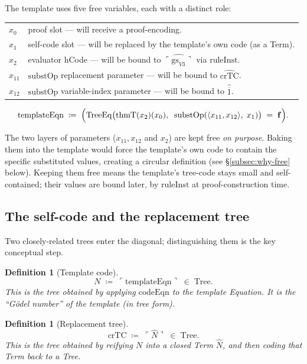 \documentclass[11pt]{article}
\newtheorem{definition}[theorem]{Definition}
\newcommand{\pair}[2]{\langle #1, #2 \rangle}
\newcommand{\falseT}{\mathbf{f}}
\newcommand{\nat}[1]{\overline{#1}}
\newcommand{\code}[1]{\ulcorner #1 \urcorner}
\newcommand{\reify}[1]{\widehat{#1}}
\newcommand{\thmT}{\mathrm{thmT}}
\newcommand{\substOp}{\mathrm{substOp}}
\newcommand{\TreeEq}{\mathrm{TreeEq}}
\begin{document}
The template uses five free variables, each with a distinct role:
\begin{center}
\begin{tabular}{@{}ll@{}}
  $x_0$    & proof slot --- will receive a proof-encoding. \\
  $x_1$    & self-code slot --- will be replaced by the template's own
               code (as a Term). \\
  $x_2$    & evaluator hCode --- will be bound to
               $\reify{\code{\mathrm{gs}_{V3}}}$ via $\mathrm{ruleInst}$. \\
  $x_{11}$ & $\substOp$ replacement parameter --- will be bound to
               $\reify{\mathrm{crTC}}$. \\
  $x_{12}$ & $\substOp$ variable-index parameter --- will be bound to
               $\reify{\nat{1}}$.
\end{tabular}
\end{center}

\[
  \mathrm{templateEqn} \;\coloneqq\;
  \Bigl(\TreeEq\bigl(\thmT(x_2)(x_0),\;\;
         \substOp(\pair{x_{11}}{x_{12}},\; x_1)\bigr) \;=\; \falseT\Bigr).
\]

The two layers of parameters ($x_{11}, x_{12}$ and $x_2$) are kept
free \emph{on purpose}.  Baking them into the template would force
the template's own code to contain the specific substituted values,
creating a circular definition (see \S\ref{subsec:why-free} below).
Keeping them free means the template's tree-code stays small and
self-contained; their values are bound later, by
$\mathrm{ruleInst}$ at proof-construction time.

\subsection{The self-code and the replacement tree}
\label{subsec:N-and-crTC}

Two closely-related trees enter the diagonal; distinguishing them is
the key conceptual step.

\begin{definition}[Template code]
\[
  N \;\coloneqq\; \code{\mathrm{templateEqn}} \;\in\; \mathrm{Tree}.
\]
This is the tree obtained by applying $\mathrm{codeEqn}$ to the
template Equation.  It is the ``Gödel number'' of the template
(in tree form).
\end{definition}

\begin{definition}[Replacement tree]
\[
  \mathrm{crTC} \;\coloneqq\; \code{\reify{N}} \;\in\; \mathrm{Tree}.
\]
This is the tree obtained by \emph{reifying} $N$ into a closed
Term $\reify{N}$, and then coding \emph{that Term} back to a Tree.
\end{definition}
\end{document}
